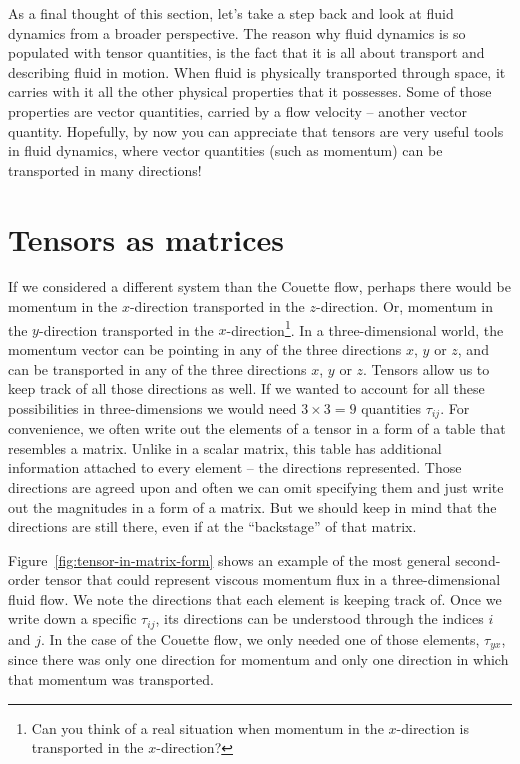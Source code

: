\documentclass[10pt,twocolumn]{article}
\begin{document}
As a final thought of this section, let's take a step back and look at fluid dynamics from a broader perspective. The reason why fluid dynamics is so populated with tensor quantities, is the fact that it is all about transport and describing fluid in motion. When fluid is physically transported through space, it carries with it all the other physical properties that it possesses. Some of those properties are vector quantities, carried by a flow velocity -- another vector quantity. Hopefully, by now you can appreciate that tensors are very useful tools in fluid dynamics, where vector quantities (such as momentum) can be transported in many directions!

\section*{Tensors as matrices}

If we considered a different system than the Couette flow, perhaps there would be momentum in the $x$-direction transported in the $z$-direction. Or, momentum in the $y$-direction transported in the $x$-direction\footnote{Can you think of a real situation when momentum in the $x$-direction is transported in the $x$-direction?}. In a three-dimensional world, the momentum vector can be pointing in any of the three directions $x$, $y$ or $z$, and can be transported in any of the three directions $x$, $y$ or $z$. Tensors allow us to keep track of all those directions as well. If we wanted to account for all these possibilities in three-dimensions we would need $3 \times 3 = 9$ quantities $\tau_{ij}$. For convenience, we often write out the elements of a tensor in a form of a table that resembles a matrix. Unlike in a scalar matrix, this table has additional information attached to every element -- the directions represented. Those directions are agreed upon and often we can omit specifying them and just write out the magnitudes in a form of a matrix. But we should keep in mind that the directions are still there, even if at the ``backstage'' of that matrix.

Figure~\ref{fig:tensor-in-matrix-form} shows an example of the most general second-order tensor that could represent viscous momentum flux in a three-dimensional fluid flow. We note the directions that each element is keeping track of. Once we write down a specific $\tau_{ij}$, its directions can be understood through the indices $i$ and $j$. In the case of the Couette flow, we only needed one of those elements, $\tau_{yx}$, since there was only one direction for momentum and only one direction in which that momentum was transported.
\end{document}

